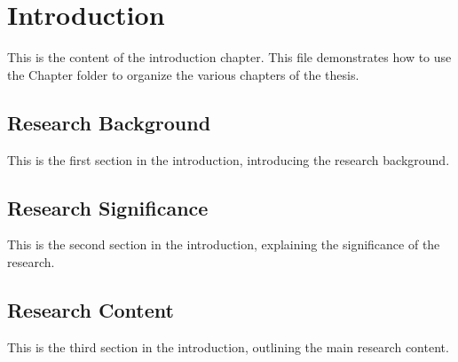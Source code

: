 \chapter{Introduction}

This is the content of the introduction chapter. This file demonstrates how to use the Chapter folder to organize the various chapters of the thesis.

\section{Research Background}
This is the first section in the introduction, introducing the research background.

\section{Research Significance}
This is the second section in the introduction, explaining the significance of the research.

\section{Research Content}
This is the third section in the introduction, outlining the main research content.